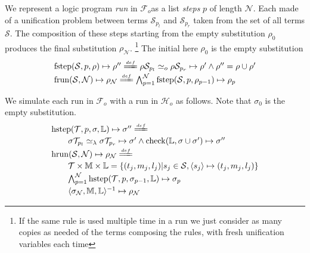\documentclass[sigconf,natbib=false,review]{acmart}
\newcommand{\UnifRel}{\ensuremath{\simeq}}
\newcommand{\Uo}{\ensuremath{\UnifRel_o}\xspace}
\newcommand{\Ue}{\ensuremath{\UnifRel_\lambda}\xspace}
\newcommand{\Fo}{\ensuremath{\mathcal{F}_{\!o}\xspace}} %
\newcommand{\Ho}{\ensuremath{\mathcal{H}_o}\xspace}
\begin{document}
We represent a logic program \emph{run} in \Fo as
a list \emph{steps} $p$ of length $\mathcal{N}$. Each made of a
unification problem between terms $\mathcal{S}_{p_l}$ and
$\mathcal{S}_{p_r}$ taken from the set of all terms $\mathcal{S}$.
The composition of these steps starting from the
empty substitution $\rho_0$ produces the final
substitution $\rho_\mathcal{N}$.
\footnote{If the same rule is used multiple time in a run we
just consider as many copies as needed of the terms composing the
rules, with fresh unification variables each time}
The initial here $\rho_0$ is the empty substitution
%
\newcommand{\progress}{\ensuremath{\mathrm{check}}\xspace}
\newcommand{\fstep}{\ensuremath{\mathrm{fstep}}\xspace}
\newcommand{\hstep}{\ensuremath{\mathrm{hstep}}\xspace}
\newcommand{\frun}{\ensuremath{\mathrm{frun}}\xspace}
\newcommand{\hrun}{\ensuremath{\mathrm{hrun}}\xspace}
\newcommand{\stepF}[4]{\ensuremath{\fstep(#1,#2,#3) \mapsto #4}}
\newcommand{\stepFD}[5]{%
\ensuremath{#3 #1_{#2_l} \Uo #3 #1_{#2_r} \mapsto #4 \land #5 = #3 \cup #4}}
\newcommand{\stepH}[5]{\ensuremath{\hstep(#1,#2,#3,#4) \mapsto #5}}
\newcommand{\stepHD}[6]{\ensuremath{%
#3 #1_{#2_l} \Ue #3 #1_{#2_r} \mapsto #4 \land \progress(#6,#3 \cup #4) \mapsto #5}}
\newcommand{\runF}[3]{\ensuremath{\frun(#1,#2) \mapsto #3_{#2}}}
\newcommand{\runFD}[2]{\ensuremath{%
\bigwedge_{p = 1}^{#2} \stepF{#1}{p}{\rho_{p-1}}{\rho_{p}}}}
\newcommand{\runH}[3]{\ensuremath{\hrun(#1,#2) \mapsto #3_{#2}}}
\newcommand{\runHD}[3]{\ensuremath{%
\bigwedge_{p = 1}^{#2} \stepH{#1}{p}{\sigma_{p-1}}{#3}{\sigma_{p}}}}
\newcommand{\deff}{\ensuremath{\stackrel{{\scriptscriptstyle def}}{=\!=\!\!\!=}}}
$$
\begin{array}{l}
\stepF{\mathcal{S}}{p}{\rho}{\rho''}
\deff
\stepFD{\mathcal{S}}{p}{\rho}{\rho'}{\rho''}\vspace{2pt}\\
\runF{\mathcal{S}}{\mathcal{N}}{\rho}
\deff
\runFD{\mathcal{S}}{\mathcal{N}}
\end{array}
$$

We simulate each run in \Fo{} with a run in \Ho as follows.
Note that $\sigma_0$ is the empty substitution.
$$
\begin{array}{l}
\stepH{\mathcal{T}}{p}{\sigma}{\mathbb{L}}{\sigma''} \deff\vspace{2pt}\\
  \qquad\stepHD{\mathcal{T}}{p}{\sigma}{\sigma'}{\sigma''}{\mathbb{L}}\vspace{2pt}\\
\runH{\mathcal{S}}{\mathcal{N}}{\rho} \deff \vspace{2pt}\\
  \qquad \mathcal{T} \times \mathbb{M} \times \mathbb{L} = \{ (t_j,m_j,l_j) | s_j \in \mathcal{S}, \C{s_j}{t_j}{m_j}{l_j} \}\vspace{2pt}\\
  \qquad \runHD{\mathcal{T}}{\mathcal{N}}{\mathbb{L}}\vspace{2pt}\\
  \qquad \D{\sigma_{\mathcal{N}}}{\mathbb{M}}{\mathbb{L}}{\rho_{\mathcal{N}}}
\end{array}
$$
\end{document}
